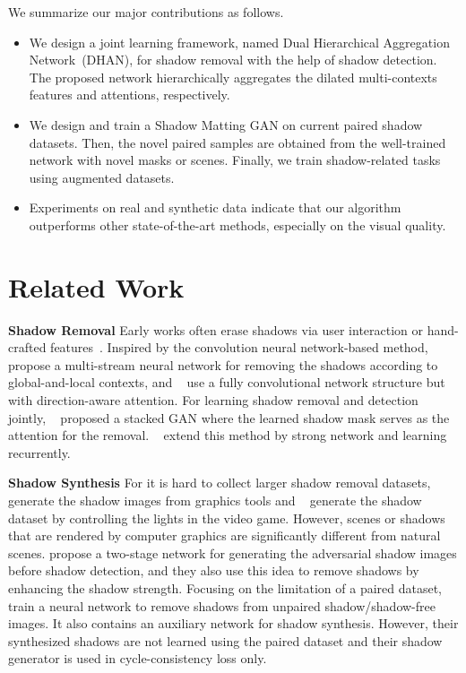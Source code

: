 \documentclass[letterpaper]{article} \usepackage{aaai20}  \usepackage{times}  \usepackage{helvet} \usepackage{courier}  \usepackage[hyphens]{url}  \urlstyle{rm} \def\UrlFont{\rm}  \usepackage{graphicx}  \frenchspacing  \setlength{\pdfpagewidth}{8.5in}  \setlength{\pdfpageheight}{11in}  \usepackage{amssymb}
\begin{document}
 We summarize our major contributions as follows.
\begin{itemize}

\item We design a joint learning framework, named Dual Hierarchical Aggregation Network~(DHAN), for shadow removal with the help of shadow detection. The proposed network hierarchically aggregates the dilated multi-contexts features and attentions, respectively.
\item We design and train a Shadow Matting GAN on current paired shadow datasets. Then, the novel paired samples are obtained from the well-trained network with novel masks or scenes. Finally, we train shadow-related tasks using augmented datasets.
\item Experiments on real and synthetic data indicate that our algorithm outperforms other state-of-the-art methods, especially on the visual quality. 
\end{itemize}

\section{Related Work}

\textbf{Shadow Removal}
Early works often erase shadows via user interaction or hand-crafted features~\cite{Guo:2013tt,khan2015automatic}. Inspired by the convolution neural network-based method, \citeauthor{qu2017deshadownet}~ propose a multi-stream neural network for removing the shadows according to global-and-local contexts, and \citeauthor{Hu:2018wd}~ use a fully convolutional network structure but with direction-aware attention. For learning shadow removal and detection jointly, \citeauthor{wang2018stacked}~ proposed a stacked GAN where the learned shadow mask serves as the attention for the removal. \citeauthor{BinDing:2019wa}~ extend this method by strong network and learning recurrently.

\noindent\textbf{Shadow Synthesis}
For it is hard to collect larger shadow removal datasets, 
\citeauthor{Gryka2015softShadows}~ generate the shadow images from graphics tools and \citeauthor{sidorov2019conditional}~  generate the shadow dataset by controlling the lights in the video game. However, scenes or shadows that are rendered by computer graphics are significantly different from natural scenes. \cite{Le:2018vu,Le-etal-ICCV19} propose a two-stage network for generating the adversarial shadow images before shadow detection, and they also use this idea to remove shadows by enhancing the shadow strength. Focusing on the limitation of a paired dataset, \citeauthor{Anonymous:XfCvZjhb}~ train a neural network to remove shadows from unpaired shadow/shadow-free images. It also contains an auxiliary network for shadow synthesis. However, their synthesized shadows are not learned using the paired dataset and their shadow generator is used in cycle-consistency loss only. 
\end{document}
